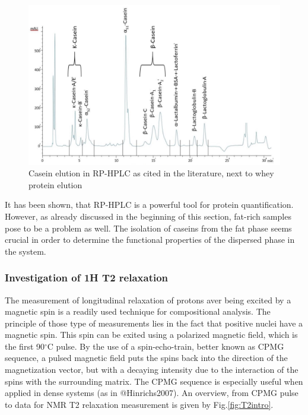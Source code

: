 \documentclass[
]{article}
\begin{document}
\begin{figure}
\centering
\includegraphics{images/elution_casein.jpg}
\caption{Casein elution in RP-HPLC as cited in the literature, next to
whey protein elution}
\end{figure}

It has been shown, that RP-HPLC is a powerful tool for protein
quantification. However, as already discussed in the beginning of this
section, fat-rich samples pose to be a problem as well. The isolation of
caseins from the fat phase seems crucial in order to determine the
functional properties of the dispersed phase in the system.

\subsubsection{Investigation of 1H T2 relaxation}

The measurement of longitudinal relaxation of protons aver being excited
by a magnetic spin is a readily used technique for compositional
analysis. The principle of those type of measurements lies in the fact
that positive nuclei have a magnetic spin. This spin can be exited using
a polarized magnetic field, which is the first 90\(^\circ\)C pulse. By
the use of a spin-echo-train, better known as CPMG sequence, a pulsed
magnetic field puts the spins back into the direction of the
magnetization vector, but with a decaying intensity due to the
interaction of the spins with the surrounding matrix. The CPMG sequence
is especially useful when applied in dense systems (as in
@Hinrichs2007). An overview, from CPMG pulse to data for NMR T2
relaxation measurement is given by Fig.\ref{fig:T2intro}.
\end{document}
